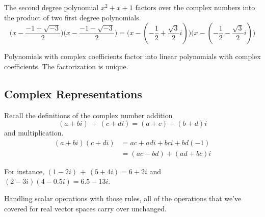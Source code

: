 \begin{example}
The second degree polynomial \( x^2+x+1 \) factors over the complex numbers 
into the product of two first degree polynomials.
\begin{equation*}
   \big(x-\frac{-1+\sqrt{-3}}{2}\big)
   \big(x-\frac{-1-\sqrt{-3}}{2}\big)
   =
   \big(x-(-\frac{1}{2}+\frac{\sqrt{3}}{2}i)\big)
   \big(x-(-\frac{1}{2}-\frac{\sqrt{3}}{2}i)\big)
\end{equation*}
\end{example}

\begin{corollary}
\hspace*{0em plus2em}
Polynomials with complex coefficients factor into linear
polynomials with complex coefficients.
The factorization is unique.
\end{corollary}











\subsection{Complex Representations}
Recall the definitions of the complex number addition
\begin{equation*}
   (a+bi)\,+\,(c+di)=(a+c)+(b+d)i                  
\end{equation*}
and multiplication.
\begin{align*}
     (a+bi)(c+di) &=ac+adi+bci+bd(-1)  \\
                  &=(ac-bd)+(ad+bc)i
\end{align*}

\begin{example}
For instance,
\( (1-2i)\,+\,(5+4i)=6+2i \) and
\( (2-3i)(4-0.5i)=6.5-13i \).
\end{example}

Handling scalar operations with those rules, all of
the operations that we've covered
for real vector spaces carry over unchanged.

